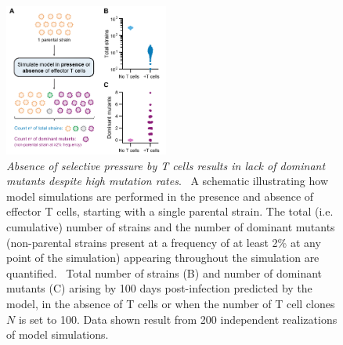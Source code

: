 \begin{figure}[t]
    \centering
    \includegraphics[width=0.48\textwidth]{Figures/VE/fig3_noTcells.pdf}
    \caption[Absence of selective pressure by T cells results in lack of dominant mutants despite high mutation rates]{\textit{Absence of selective pressure by T cells results in lack of dominant mutants despite high mutation rates}. %
    ~A schematic illustrating how model simulations are performed in the presence and absence of effector T cells, starting with a single parental strain. The total (i.e. cumulative) number of strains and the number of dominant mutants (non-parental strains present at a frequency of at least 2\% at any point of the simulation) appearing throughout the simulation are quantified. %
    ~Total number of strains (B) and number of dominant mutants (C) arising by 100 days post-infection predicted by the model, in the absence of T cells or when the number of T cell clones $N$ is set to 100. Data shown result from 200 independent realizations of model simulations.%
    }
    \label{fig:VE_noTcells}
\end{figure}
%

